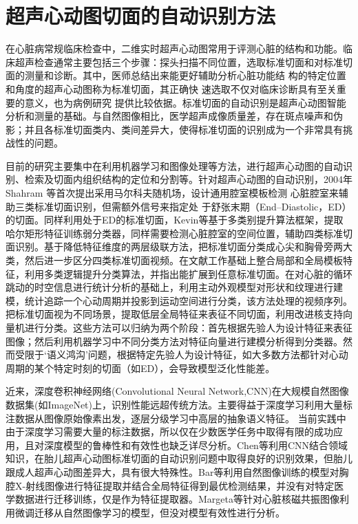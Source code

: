 \chapter{超声心动图切面的自动识别方法}
\label{chap:classification}

在心脏病常规临床检查中，二维实时超声心动图常用于评测心脏的结构和功能。临床超声检查通常主要包括三个步骤：探头扫描不同位置，选取标准切面和对标准切面的测量和诊断\citep{Chen2015}。其中，医师总结出来能更好辅助分析心脏功能结 构的特定位置和角度的超声心动图称为标准切面，其正确快 速选取不仅对临床诊断具有至关重要的意义，也为病例研究 提供比较依据。标准切面的自动识别是超声心动图智能分析和测量的基础。与自然图像相比，医学超声成像质量差，存在斑点噪声和伪影；并且各标准切面类内、类间差异大，使得标准切面的识别成为一个非常具有挑战性的问题。 

目前的研究主要集中在利用机器学习和图像处理等方法，进行超声心动图的自动识别、检索及切面内组织结构的定位和分割等。针对超声心动图的自动识别，2004年Shahram 等\citep{Ebadollahi2004}首次提出采用马尔科夫随机场，设计通用腔室模板检测 心脏腔室来辅助三类标准切面识别，但需额外信号来指定处 于舒张末期（End–Diastolic，ED）的切面。同样利用处于ED的标准切面，Kevin等\citep{KevinZhou2006}基于多类别提升算法框架，提取哈尔矩形特征训练弱分类器，同样需要检测心脏腔室的空间位置，辅助四类标准切面识别。基于降低特征维度的两层级联方法，把标准切面分类成心尖和胸骨旁两大类，然后进一步区分四类标准切面视频\citep{Otey2006,Roy2006b}。在文献工作基础上整合局部和全局模板特征，利用多类逻辑提升分类算法，并指出能扩展到任意标准切面\citep{Park2007a}。在对心脏的循环跳动的时空信息进行统计分析的基础上，利用主动外观模型对形状和纹理进行建模，统计追踪一个心动周期并投影到运动空间进行分类\citep{Beymer2008}，该方法处理的视频序列。把标准切面视为不同场景，提取低层全局特征来表征不同切面，利用改进核支持向量机进行分类\citep{Wu2014c}。这些方法可以归纳为两个阶段：首先根据先验人为设计特征来表征图像；然后利用机器学习中不同分类方法对特征向量进行建模分析得到分类器。然而受限于‘语义鸿沟’问题，根据特定先验人为设计特征，如大多数方法都针对心动周期的某个特定时刻的切面（如ED），会导致模型泛化性能差。

近来，深度卷积神经网络(Convolutional Neural Network,CNN)在大规模自然图像数据集(如ImageNet\citep{Russakovsky})上，识别性能远超传统方法\citep{Krizhevsky2012}。主要得益于深度学习利用大量标注数据从图像原始像素出发，逐层分级学习中高层的抽象语义特征\citep{Sharif2014}。
当前实践中由于深度学习需要大量的标注数据，所以仅在少数医学任务中取得有限的成功应用，且对深度模型的鲁棒性和有效性也缺乏详尽分析。Chen等\citep{Chen2015}利用CNN结合领域知识，在胎儿超声心动图标准切面的自动识别问题中取得良好的识别效果，但胎儿跟成人超声心动图差异大，具有很大特殊性。Bar等\citep{Bar2015Chest}利用自然图像训练的模型对胸腔X-射线图像进行特征提取并结合全局特征\citep{Oliva2001}得到最优检测结果，并没有对特定医学数据进行迁移训练，仅是作为特征提取器。Margeta等\citep{Margeta2015}针对心脏核磁共振图像利用微调迁移从自然图像学习的模型，但没对模型有效性进行分析。

